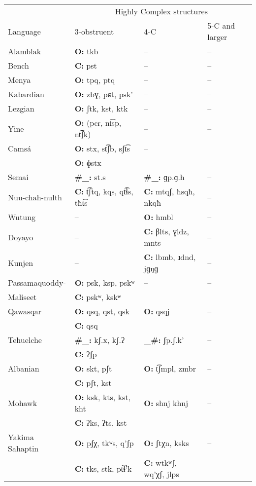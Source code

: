 \begin{table}\footnotesize
\begin{tabular}{llll}
\lsptoprule
 & \multicolumn{3}{c}{Highly Complex structures}\\\cmidrule(lr){2-4}
{Language} & 3-obstruent & 4-C & 5-C and larger\\\midrule
{Alamblak} & \textbf{O:} tkb & -- & --\\
{Bench} & \textbf{C:} pst & -- & --\\
{Menya} & \textbf{O:} tpq, ptq & -- & --\\
{Kabardian} & \textbf{O:} zbɣ, pɕt, psk’ & -- & --\\
{Lezgian} & \textbf{O:} ʃtk, kst, ktk & -- & --\\
{Yine} & \textbf{O:} (pcɾ, nt͡sp, nt͡ʃk) & -- & --\\
{Camsá} & \textbf{O:} stx, st͡ʃb, sʃt͡s & -- \\
        & {\textbf{O:} ɸstx} & \\
{Semai} & \textbf{\#\_:} st.s & \textbf{\#\_:} ɡp.ɡ.h & --\\
{Nuu-chah-nulth} & \textbf{C:} t͡ʃtq, kqs, qt͡ɬs, tħt͡s & \textbf{C:} mtqʃ, ħsqħ, nkqħ & --\\
{Wutung} & -- & \textbf{O:} hmbl & --\\
{Doyayo} & -- & \textbf{C:} βlts, ɣldz, mnts & --\\
{Kunjen} & -- & \textbf{C:} lbmb, ɹdnd, jɡŋɡ & --\\
{Passamaquoddy-} & \textbf{O:} psk, ksp, pskʷ & -- & --\\
                        Maliseet &  \textbf{C:} pskʷ, kskʷ  \\
{Qawasqar} & \textbf{O:} qsq, qst, qsk & \textbf{O:} qsqj & --\\
           & \textbf{C:} qsq  \\
{Tehuelche} & \textbf{\#\_:} kʃ.x, kʃ.ʔ  & \textbf{\_\#:} ʃp.ʃ.k’ & --\\
            & \textbf{C:} ʔʃp\\
{Albanian} & \textbf{O:} skt, pʃt & \textbf{O:} t͡ʃmpl, zmbr & --\\
            & \textbf{C:} pʃt, kst  \\
{Mohawk} & \textbf{O:} ksk, kts, kst, kht  & \textbf{O:} shnj khnj & --\\
            & \textbf{C:} ʔks, ʔts, kst \\
{Yakima Sahaptin} & \textbf{O:} pʃχ, tkʷs, q’ʃp  & \textbf{O:} ʃtχn, ksks   & --\\
                    &  \textbf{C:} tks, stk, pt͡ɬ’k & \textbf{C:} wtkʷʃ, wq’χʃ, jlps\\

\end{tabular}
\end{table}
